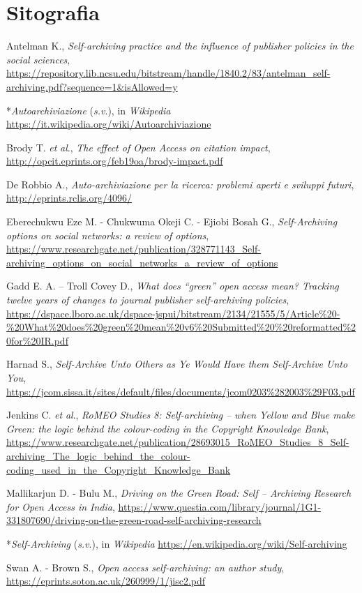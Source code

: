 \section*{Sitografia}
{\parindent0pt 
Antelman K., \emph{Self-archiving practice and the influence of
publisher policies in the social sciences},
\url{https://repository.lib.ncsu.edu/bitstream/handle/1840.2/83/antelman_self-archiving.pdf?sequence=1\&isAllowed=y}

*\emph{Autoarchiviazione} (\emph{s.v}.), in \emph{Wikipedia}
\url{https://it.wikipedia.org/wiki/Autoarchiviazione}

Brody T. \emph{et} \emph{al}., \emph{The effect of Open Access on
citation impact},
\url{http://opcit.eprints.org/feb19oa/brody-impact.pdf}

De Robbio A., \emph{Auto-archiviazione per la ricerca: problemi aperti e
sviluppi futuri},
\url{http://eprints.rclis.org/4096/}

Eberechukwu Eze M. - Chukwuma Okeji C. - Ejiobi Bosah G.,
\emph{Self-Archiving options on social networks: a review of options},
\url{https://www.researchgate.net/publication/328771143_Self-archiving_options_on_social_networks_a_review_of_options}

Gadd E. A. -- Troll Covey D., \emph{What does ``green'' open access
mean? Tracking twelve years of changes to journal publisher
self-archiving policies},
\url{https://dspace.lboro.ac.uk/dspace-jspui/bitstream/2134/21555/5/Article\%20-\%20What\%20does\%20green\%20mean\%20v6\%20Submitted\%20\%20reformatted\%20for\%20IR.pdf}

Harnad S., \emph{Self-Archive Unto Others as Ye Would Have them
Self-Archive Unto You}, 
\url{https://jcom.sissa.it/sites/default/files/documents/jcom0203\%282003\%29F03.pdf}

Jenkins C. \emph{et} \emph{al}., \emph{RoMEO Studies 8: Self-archiving
-- when Yellow and Blue make Green: the logic behind the colour-coding
in the Copyright Knowledge Bank},
\url{https://www.researchgate.net/publication/28693015_RoMEO_Studies_8_Self-archiving_The_logic_behind_the_colour-coding_used_in_the_Copyright_Knowledge_Bank}

Mallikarjun D. - Bulu M., \emph{Driving on the Green Road: Self --
Archiving Research for Open Access in India},
\url{https://www.questia.com/library/journal/1G1-331807690/driving-on-the-green-road-self-archiving-research}

*\emph{Self-Archiving} (\emph{s.v}.), in \emph{Wikipedia}
\url{https://en.wikipedia.org/wiki/Self-archiving}

Swan A. - Brown S., \emph{Open access self-archiving: an author study},
\url{https://eprints.soton.ac.uk/260999/1/jisc2.pdf}

}

